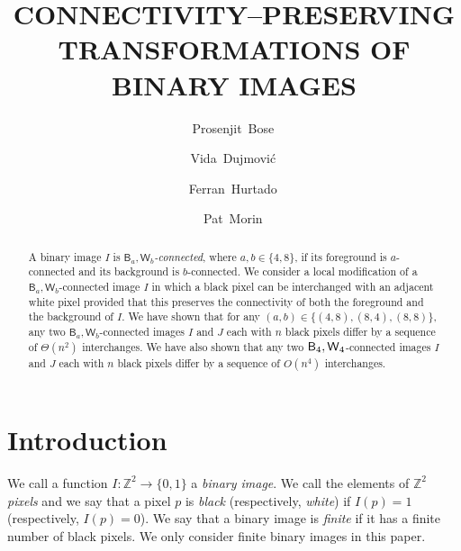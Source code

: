 \documentclass[lotsofwhite,charterfonts]{patmorin}
\title{\MakeUppercase{Connectivity--Preserving Transformations 
	of Binary Images}}
\author{
\mbox{Prosenjit Bose}\,\footnotemark[1]
\and
\and
\mbox{Vida Dujmovi{\'c}}\,\footnotemark[1]
\and
\mbox{Ferran Hurtado}\,\footnotemark[2]
\and
\mbox{Pat Morin}\,\footnotemark[1]
}
\date{}
\newcommand{\Z}{\mathbb{Z}}
\newcommand{\fourfour}{\ensuremath{\protect\textup{\textsf{B}}_{4},\protect\textup{\textsf{W}}_{4}}}
\begin{document}
\maketitle



\begin{abstract} 
A binary image $I$ is \emph{$\textsf{B}_a,\textsf{W}_b$-connected}, where $a,b\in\{4,8\}$, if its foreground is $a$-connected and its background is $b$-connected. We consider a local modification of a $\textsf{B}_a,\textsf{W}_b$-connected image $I$ in which a black pixel can be interchanged with an adjacent white pixel provided that this preserves the connectivity of both the foreground and the background of $I$. We have shown that for any $(a,b)\in\{(4,8),(8,4),(8,8)\}$, any two $\textsf{B}_a,\textsf{W}_b$-connected images $I$ and $J$ each with $n$ black pixels differ by a sequence of $\Theta(n^2)$ interchanges.  We have also shown that any two \fourfour-connected images $I$ and $J$ each with $n$ black pixels differ by a sequence of $O(n^4)$ interchanges.
\end{abstract}

\section{Introduction}

We call a function $I:\Z^2\rightarrow\{0,1\}$ a \emph{binary image}.
We call the elements of $\Z^2$ \emph{pixels} and we say that a pixel
$p$ is \emph{black} (respectively, \emph{white}) if $I(p)=1$
(respectively, $I(p)=0$).  We say that a binary image is \emph{finite} if it
has a finite number of black pixels. We only consider finite binary images in this paper. 
\end{document}
